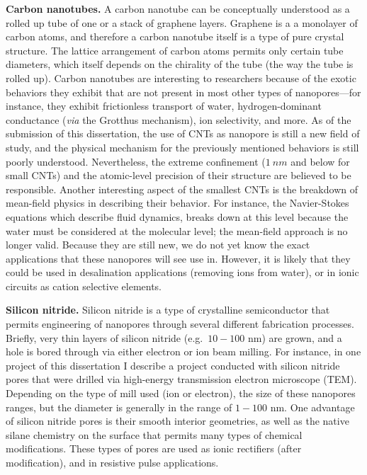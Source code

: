 			\textbf{Carbon nanotubes.} A carbon nanotube can be conceptually understood as a rolled up tube of one or a stack of graphene layers. Graphene is a a monolayer of carbon atoms, and therefore a carbon nanotube itself is a type of pure crystal structure. The lattice arrangement of carbon atoms permits only certain tube diameters, which itself depends on the chirality of the tube (the way the tube is rolled up). Carbon nanotubes are interesting to researchers because of the exotic behaviors they exhibit that are not present in most other types of nanopores---for instance, they exhibit frictionless transport of water, hydrogen-dominant conductance (\textit{via} the Grotthus mechanism), ion selectivity, and more. As of the submission of this dissertation, the use of CNTs as nanopore is still a new field of study, and the physical mechanism for the previously mentioned behaviors is still poorly understood. Nevertheless, the extreme confinement ($\SI{1}{nm}$ and below for small CNTs) and the atomic-level precision of their structure are believed to be responsible. Another interesting aspect of the smallest CNTs is the breakdown of mean-field physics in describing their behavior. For instance, the Navier-Stokes equations which describe fluid dynamics, breaks down at this level because the water must be considered at the molecular level; the mean-field approach is no longer valid. Because they are still new, we do not yet know the exact applications that these nanopores will see use in. However, it is likely that they could be used in desalination applications (removing ions from water), or in ionic circuits as cation selective elements.

			\textbf{Silicon nitride.} Silicon nitride is a type of crystalline semiconductor that permits engineering of nanopores through several different fabrication processes. Briefly, very thin layers of silicon nitride (e.g.~$10-100$ nm) are grown, and a hole is bored through via either electron or ion beam milling. For instance, in one project of this dissertation I describe a project conducted with silicon nitride pores that were drilled via high-energy transmission electron microscope (TEM). Depending on the type of mill used (ion or electron), the size of these nanopores ranges, but the diameter is generally in the range of $1-100$ nm. One advantage of silicon nitride pores is their smooth interior geometries, as well as the native silane chemistry on the surface that permits many types of chemical modifications. These types of pores are used as ionic rectifiers (after modification), and in resistive pulse applications.

